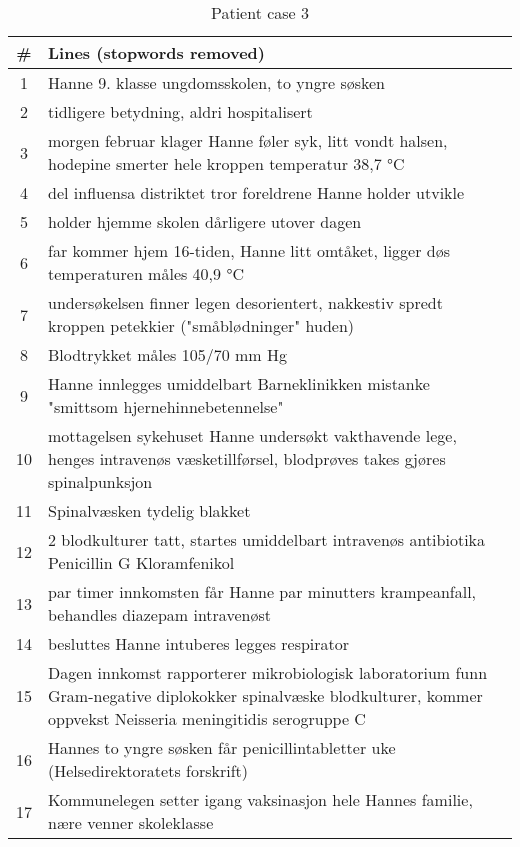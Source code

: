 \begin{table}[htbp] \footnotesize \center
\caption{Patient case 3\label{tab:case3}}
\begin{tabularx}{\textwidth}{c X}
    \toprule
    \# & Lines (stopwords removed) \\
    \midrule
    1 & Hanne 9. klasse ungdomsskolen, to yngre søsken \\
    2 & tidligere betydning, aldri hospitalisert \\
    3 & morgen februar klager Hanne føler syk, litt vondt halsen, hodepine smerter hele kroppen temperatur 38,7 °C \\
    4 & del influensa distriktet tror foreldrene Hanne holder utvikle \\
    5 & holder hjemme skolen dårligere utover dagen \\
    6 & far kommer hjem 16-tiden, Hanne litt omtåket, ligger døs temperaturen måles 40,9 °C \\
    7 & undersøkelsen finner legen desorientert, nakkestiv spredt kroppen petekkier ("småblødninger" huden) \\
    8 & Blodtrykket måles 105/70 mm Hg \\
    9 & Hanne innlegges umiddelbart Barneklinikken mistanke "smittsom hjernehinnebetennelse" \\
    10 & mottagelsen sykehuset Hanne undersøkt vakthavende lege, henges intravenøs væsketillførsel, blodprøves takes gjøres spinalpunksjon \\
    11 & Spinalvæsken tydelig blakket \\
    12 & 2 blodkulturer tatt, startes umiddelbart intravenøs antibiotika Penicillin G Kloramfenikol \\
    13 & par timer innkomsten får Hanne par minutters krampeanfall, behandles diazepam intravenøst \\
    14 & besluttes Hanne intuberes legges respirator \\
    15 & Dagen innkomst rapporterer mikrobiologisk laboratorium funn Gram-negative diplokokker spinalvæske blodkulturer, kommer oppvekst Neisseria meningitidis serogruppe C \\
    16 & Hannes to yngre søsken får penicillintabletter uke (Helsedirektoratets forskrift) \\
    17 & Kommunelegen setter igang vaksinasjon hele Hannes familie, nære venner skoleklasse \\
    \bottomrule
\end{tabularx}
\end{table}

